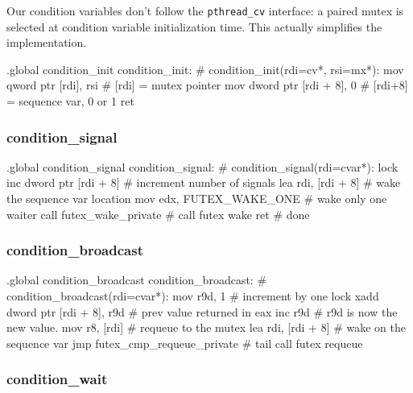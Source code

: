 Our condition variables don't follow the \lstinline|pthread_cv| interface: a
paired mutex is selected at condition variable initialization time. This
actually simplifies the implementation.

\begin{asm}
.global condition_init
condition_init: 			    # condition_init(rdi=cv*, rsi=mx*):
	mov	qword ptr [rdi], rsi	    #   [rdi] = mutex pointer
	mov	dword ptr [rdi + 8], 0	    #   [rdi+8] = sequence var, 0 or 1
	ret
\end{asm}

\subsubsection{condition\_signal}

\begin{asm}
.global condition_signal
condition_signal:			    # condition_signal(rdi=cvar*):
	lock	inc dword ptr [rdi + 8]	    #   increment number of signals
	lea	rdi, [rdi + 8]		    #   wake the sequence var location
	mov	edx, FUTEX_WAKE_ONE	    #   wake only one waiter
	call	futex_wake_private	    #   call futex wake
	ret				    #   done
\end{asm}

\subsubsection{condition\_broadcast}

\begin{asm}
.global condition_broadcast
condition_broadcast:			    # condition_broadcast(rdi=cvar*):
	mov	r9d, 1			    #   increment by one
	lock xadd dword ptr [rdi + 8], r9d  #   prev value returned in eax
	inc	r9d			    #   r9d is now the new value.
	mov	r8, [rdi]		    #   requeue to the mutex
	lea	rdi, [rdi + 8]		    #   wake on the sequence var
	jmp	futex_cmp_requeue_private   #   tail call futex requeue
\end{asm}

\subsubsection{condition\_wait}

